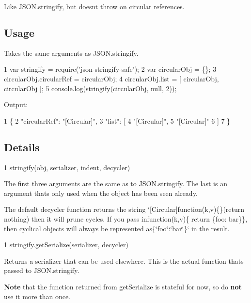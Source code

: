 Like J\+S\+O\+N.\+stringify, but doesn\textquotesingle{}t throw on circular references.

\subsection*{Usage}

Takes the same arguments as {\ttfamily J\+S\+O\+N.\+stringify}.


\begin{DoxyCode}
1 var stringify = require('json-stringify-safe');
2 var circularObj = \{\};
3 circularObj.circularRef = circularObj;
4 circularObj.list = [ circularObj, circularObj ];
5 console.log(stringify(circularObj, null, 2));
\end{DoxyCode}


Output\+:


\begin{DoxyCode}
1 \{
2   "circularRef": "[Circular]",
3   "list": [
4     "[Circular]",
5     "[Circular]"
6   ]
7 \}
\end{DoxyCode}


\subsection*{Details}


\begin{DoxyCode}
1 stringify(obj, serializer, indent, decycler)
\end{DoxyCode}


The first three arguments are the same as to J\+S\+O\+N.\+stringify. The last is an argument that\textquotesingle{}s only used when the object has been seen already.

The default {\ttfamily decycler} function returns the string `\textquotesingle{}\mbox{[}Circular\mbox{]}function(k,v)\{\}{\ttfamily (return nothing) then it will prune cycles. If you pass in}function(k,v)\{ return \{foo\+: \textquotesingle{}bar\textquotesingle{}\}\}{\ttfamily , then cyclical objects will always be represented as}\{\char`\"{}foo\char`\"{}\+:\char`\"{}bar\char`\"{}\}` in the result.


\begin{DoxyCode}
1 stringify.getSerialize(serializer, decycler)
\end{DoxyCode}


Returns a serializer that can be used elsewhere. This is the actual function that\textquotesingle{}s passed to J\+S\+O\+N.\+stringify.

{\bfseries Note} that the function returned from {\ttfamily get\+Serialize} is stateful for now, so do {\bfseries not} use it more than once. 
